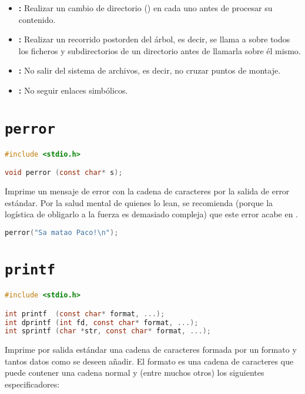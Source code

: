 \begin{itemize}
	\item{}\textbf{:} Realizar un cambio de directorio () en cada uno antes de procesar su contenido.
	\item{}\textbf{:} Realizar un recorrido postorden del árbol, es decir, se llama a  sobre todos los ficheros y subdirectorios de un directorio antes de llamarla sobre él mismo.
	\item{}\textbf{:} No salir del sistema de archivos, es decir, no cruzar puntos de montaje.
	\item{}\textbf{:} No seguir enlaces simbólicos.
\end{itemize}

\section{\texttt{perror}}

\begin{lstlisting}[language=C]
#include <stdio.h>

void perror (const char* s);
\end{lstlisting}

Imprime un mensaje de error con la cadena de caracteres  por la salida de error estándar.
Por la salud mental de quienes lo lean, se recomienda (porque la logística de obligarlo a la fuerza es demasiado compleja) que este error acabe en .

\begin{lstlisting}[language=C]
perror("Sa matao Paco!\n");
\end{lstlisting}

\section{\texttt{printf}}

\begin{lstlisting}[language=C]
#include <stdio.h>

int printf  (const char* format, ...);
int dprintf (int fd, const char* format, ...);
int sprintf (char *str, const char* format, ...);
\end{lstlisting}

Imprime por salida estándar una cadena de caracteres formada por un formato  y tantos datos como se deseen añadir.
El formato es una cadena de caracteres que puede contener una cadena normal y (entre muchos otros) los siguientes especificadores:


